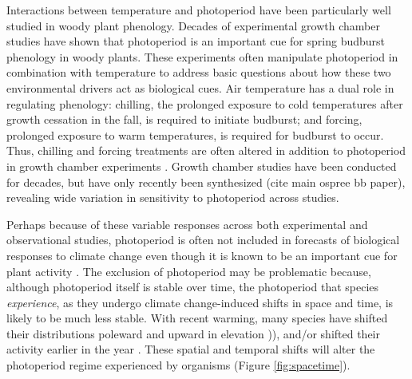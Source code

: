 \documentclass{article}
\begin{document}
\par Interactions between temperature and photoperiod have been particularly well studied in woody plant phenology. Decades of experimental growth chamber studies have shown that photoperiod is an important cue for spring budburst phenology in woody plants. These experiments often manipulate photoperiod in combination with temperature to address basic questions about how these two environmental drivers act as biological cues. Air temperature has a dual role in regulating phenology: chilling, the prolonged exposure to cold temperatures after growth cessation in the fall, is required to initiate budburst; and forcing, prolonged exposure to warm temperatures, is required for budburst to occur. Thus, chilling and forcing treatments are often altered in addition to photoperiod in growth chamber experiments \citep[e.g.,][]{Campbell:1975aa,HEIDE:1977aa,Falusi:1990aa,Spann:2004aa,Laube:2014a}. Growth chamber studies have been conducted for decades, but have only recently been synthesized (cite main ospree bb paper), revealing wide variation in sensitivity to photoperiod across studies. 

\par Perhaps because of these variable responses across both experimental and observational studies, photoperiod is often not included in forecasts of biological responses to climate change even though it is known to be an important cue for plant activity \citet[but see ][]{duputie2015}. %
The exclusion of photoperiod may be problematic because, although photoperiod itself is stable over time, the photoperiod that species \emph{experience}, as they undergo climate change-induced shifts in space and time, is likely to be much less stable. With recent warming, many species have shifted their distributions poleward and upward in elevation \citep[i.e., range shifts][]{parmesan2006,chen2011,harsch2009})), and/or shifted their activity earlier in the year \citep[i.e., phenological shifts][]{parmesan2006, wolkovich2012}. These spatial and temporal shifts will alter the photoperiod regime experienced by organisms (Figure \ref{fig:spacetime}). 
\end{document}
